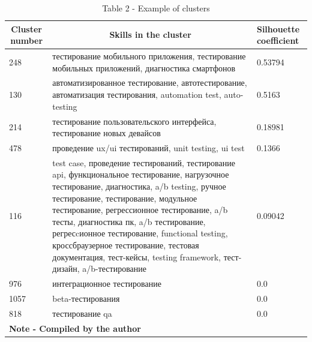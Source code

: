 \begin{table}[H]
\caption*{Table 2 - Example of clusters}
\centering
\begin{tabular}{|llp{}|}
\hline
\multicolumn{1}{|c|}{\textbf{Cluster number}} &
  \multicolumn{1}{c|}{\textbf{Skills in the cluster}} &
  \textbf{Silhouette coefficient} \\ \hline
\multicolumn{1}{|l|}{248} &
  \multicolumn{1}{p{0.6\textwidth}|}{тестирование мобильного приложения, тестирование мобильных приложений, диагностика смартфонов} &
  0.53794 \\ \hline
\multicolumn{1}{|l|}{130} &
  \multicolumn{1}{p{0.6\textwidth}|}{автоматизированное тестирование, автотестирование, автоматизация тестирования, automation test, auto-testing} &
  0.5163 \\ \hline
\multicolumn{1}{|l|}{214} &
  \multicolumn{1}{p{0.6\textwidth}|}{тестирование пользовательского интерфейса, тестирование новых девайсов} &
  0.18981 \\ \hline
\multicolumn{1}{|l|}{478} &
  \multicolumn{1}{p{0.6\textwidth}|}{проведение ux/ui тестирований, unit testing, ui test} &
  0.1366 \\ \hline
\multicolumn{1}{|l|}{116} &
  \multicolumn{1}{p{0.6\textwidth}|}{test case, проведение тестирований, тестирование api, функциональное тестирование, нагрузочное тестирование, диагностика, a/b testing, ручное тестирование, тестирование, модульное тестирование, регрессионное тестирование, a/b тесты, диагностика пк, a/b тестирование, регресcионное тестирование, functional testing, кроссбраузерное тестирование, тестовая документация, тест-кейсы, testing framework, тест-дизайн, a/b-тестирование} &
  0.09042 \\ \hline
\multicolumn{1}{|l|}{976} &
  \multicolumn{1}{l|}{интеграционное тестирование} &
  0.0 \\ \hline
\multicolumn{1}{|l|}{1057} &
  \multicolumn{1}{l|}{beta-тестирования} &
  0.0 \\ \hline
\multicolumn{1}{|l|}{818} &
  \multicolumn{1}{l|}{тестирование qa} &
  0.0 \\ \hline
\multicolumn{3}{|l|}{\textbf{Note - Compiled by the author}} \\ \hline
\end{tabular}%
\end{table}

